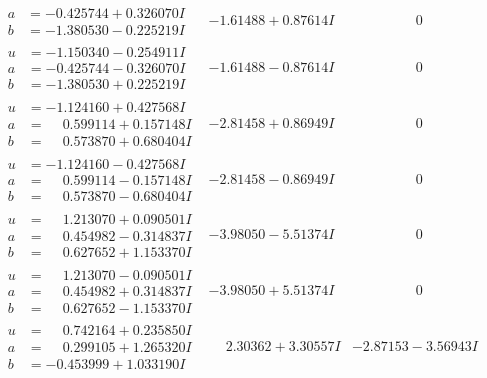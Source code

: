 \documentclass[1p]{elsarticle_modified}
\theoremstyle{definition}
\begin{document}
$$\begin{array}{c|c|c}
\begin{aligned}
a &= -0.425744 + 0.326070 I \\
b &= -1.380530 - 0.225219 I\end{aligned}
 & -1.61488 + 0.87614 I & \phantom{-0.000000 } 0 \\ \hline\begin{aligned}
u &= -1.150340 - 0.254911 I \\
a &= -0.425744 - 0.326070 I \\
b &= -1.380530 + 0.225219 I\end{aligned}
 & -1.61488 - 0.87614 I & \phantom{-0.000000 } 0 \\ \hline\begin{aligned}
u &= -1.124160 + 0.427568 I \\
a &= \phantom{-}0.599114 + 0.157148 I \\
b &= \phantom{-}0.573870 + 0.680404 I\end{aligned}
 & -2.81458 + 0.86949 I & \phantom{-0.000000 } 0 \\ \hline\begin{aligned}
u &= -1.124160 - 0.427568 I \\
a &= \phantom{-}0.599114 - 0.157148 I \\
b &= \phantom{-}0.573870 - 0.680404 I\end{aligned}
 & -2.81458 - 0.86949 I & \phantom{-0.000000 } 0 \\ \hline\begin{aligned}
u &= \phantom{-}1.213070 + 0.090501 I \\
a &= \phantom{-}0.454982 - 0.314837 I \\
b &= \phantom{-}0.627652 + 1.153370 I\end{aligned}
 & -3.98050 - 5.51374 I & \phantom{-0.000000 } 0 \\ \hline\begin{aligned}
u &= \phantom{-}1.213070 - 0.090501 I \\
a &= \phantom{-}0.454982 + 0.314837 I \\
b &= \phantom{-}0.627652 - 1.153370 I\end{aligned}
 & -3.98050 + 5.51374 I & \phantom{-0.000000 } 0 \\ \hline\begin{aligned}
u &= \phantom{-}0.742164 + 0.235850 I \\
a &= \phantom{-}0.299105 + 1.265320 I \\
b &= -0.453999 + 1.033190 I\end{aligned}
 & \phantom{-}2.30362 + 3.30557 I & -2.87153 - 3.56943 I \\ \hline\begin{aligned}

\end{aligned}
\end{array}$$
\end{document}
